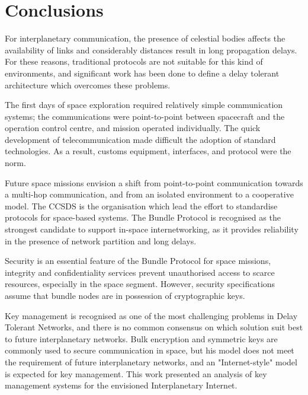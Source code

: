 \section{Conclusions}
\label{sec:con}

For interplanetary communication, the presence of celestial bodies affects the availability of links and considerably distances result in long propagation delays. For these reasons, traditional protocols are not suitable for this kind of environments, and significant work has been done to define a delay tolerant architecture which overcomes these problems.   


The first days of space exploration required relatively simple communication systems; the communications were point-to-point between spacecraft and the operation control centre, and mission operated individually. The quick development of telecommunication made difficult the adoption of standard technologies. As a result, customs equipment, interfaces, and protocol were the norm. 


Future space missions envision a shift from point-to-point communication towards a multi-hop communication, and from an isolated environment to a cooperative model. The CCSDS is the organisation which lead the effort to standardise protocols for space-based systems. The Bundle Protocol is recognised as the strongest candidate to support in-space internetworking, as it provides reliability in the presence of network partition and long delays. 

Security is an essential feature of the Bundle Protocol for space missions, integrity and confidentiality services prevent unauthorised access to scarce resources, especially in the space segment. However, security specifications assume that bundle nodes are in possession of cryptographic keys.     

Key management is recognised as one of the most challenging problems in Delay Tolerant Networks, and there is no common consensus on which solution suit best to future interplanetary networks. Bulk encryption and symmetric keys are commonly used to secure communication in space, but his model does not meet the requirement of future interplanetary networks, and an "Internet-style" model is expected for key management. This work presented an analysis of key management systems for the envisioned Interplanetary Internet. 


